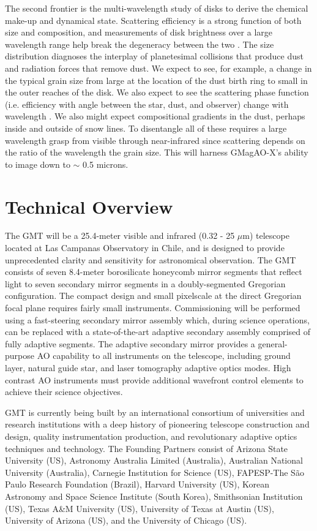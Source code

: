 \documentclass[12pt,preprint]{aastex}
\begin{document}
The second frontier is the multi-wavelength study of disks to derive the
chemical make-up and dynamical state.  Scattering efficiency is a strong
function of both size and composition, and measurements of disk brightness
over a large wavelength range help break the degeneracy between the two
\citep{2015ApJ...798...96R}. The size distribution diagnoses the interplay of
planetesimal collisions that produce dust and radiation forces that remove
dust. We expect to see, for example, a change in the typical grain size from
large at the location of the dust birth ring to small in the outer reaches of
the disk. We also expect to see the scattering phase function (i.e. efficiency
with angle between the star, dust, and observer) change with wavelength \citep{2014ApJ...789...58S}. We also might expect compositional gradients in the dust,
perhaps inside and outside of snow lines. To disentangle all of these requires
a large wavelength grasp from visible through near-infrared since scattering
depends on the ratio of the wavelength the grain size. This will harness GMagAO-X's ability to
image down to $\sim$ 0.5 microns.

\section{Technical Overview}

The GMT will be a 25.4-meter visible and infrared (0.32 - 25 $\mu$m) telescope located at Las Campanas Observatory in Chile, and is designed to provide unprecedented clarity and sensitivity for astronomical observation. The GMT consists of seven 8.4-meter borosilicate honeycomb mirror segments that reflect light to seven secondary mirror segments in a doubly-segmented Gregorian configuration. The compact design and small pixelscale at the direct Gregorian focal plane requires fairly small instruments. Commissioning will be performed using a fast-steering secondary mirror assembly which, during science operations, can be replaced with a state-of-the-art adaptive secondary assembly comprised of fully adaptive segments. The adaptive secondary mirror provides a general-purpose AO capability to all instruments on the telescope, including ground layer, natural guide star, and laser tomography adaptive optics modes. High contrast AO instruments must provide additional wavefront control elements to achieve their science objectives.

GMT is currently being built by an international consortium of universities and research institutions with a deep history of pioneering telescope construction and design, quality instrumentation production, and revolutionary adaptive optics techniques and technology. The Founding Partners consist of Arizona State University (US), Astronomy Australia Limited (Australia), Australian National University (Australia), Carnegie Institution for Science (US), FAPESP-The S\~ao Paulo Research Foundation (Brazil), Harvard University (US), Korean Astronomy and Space Science Institute (South Korea), Smithsonian Institution (US), Texas A\&M University (US), University of Texas at Austin (US), University of Arizona (US), and the University of Chicago (US).
\end{document}
